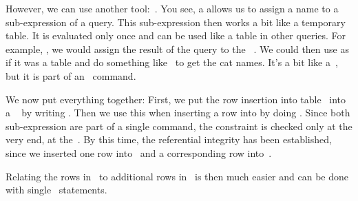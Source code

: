 %
However, we can use another tool:~.
You see, a  allows us to assign a name to a sub-expression of a query.
This sub-expression then works a bit like a temporary table.
It is evaluated only once and can be used like a table in other queries.
For example, , we would assign the result of the query  to the ~.
We could then use  as if it was a table and do something like~ to get the cat names.
It's a bit like a~, but it is part of an \sql\ command.%
%
\begin{sloppypar}%
We now put everything together:
First, we put the row insertion into table~ into a ~ by writing .
Then we use this  when inserting a row into  by doing .
Since both sub-expression are part of a single command, the constraint  is checked only at the very end, at the~\sqlil{;}.
By this time, the referential integrity has been established, since we inserted one row into~ and a corresponding row into~.%
\end{sloppypar}%
%
Relating the rows in~ to additional rows in~ is then much easier and can be done with single ~statements.
%
\FloatBarrier%
\endhsection%
%
